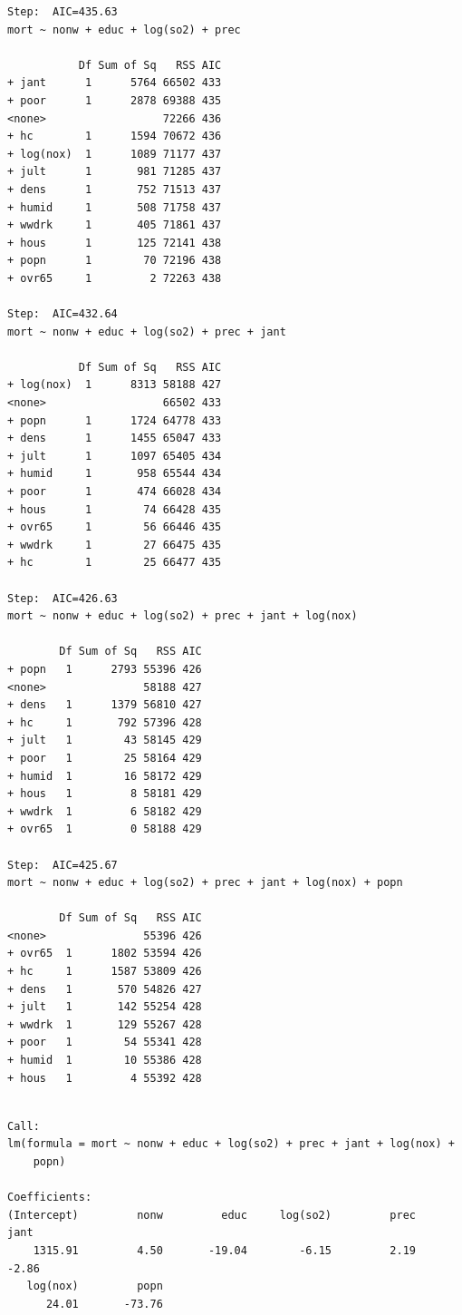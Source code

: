 \documentclass[
]{book}
\begin{document}
\begin{verbatim}
Step:  AIC=435.63
mort ~ nonw + educ + log(so2) + prec

           Df Sum of Sq   RSS AIC
+ jant      1      5764 66502 433
+ poor      1      2878 69388 435
<none>                  72266 436
+ hc        1      1594 70672 436
+ log(nox)  1      1089 71177 437
+ jult      1       981 71285 437
+ dens      1       752 71513 437
+ humid     1       508 71758 437
+ wwdrk     1       405 71861 437
+ hous      1       125 72141 438
+ popn      1        70 72196 438
+ ovr65     1         2 72263 438

Step:  AIC=432.64
mort ~ nonw + educ + log(so2) + prec + jant

           Df Sum of Sq   RSS AIC
+ log(nox)  1      8313 58188 427
<none>                  66502 433
+ popn      1      1724 64778 433
+ dens      1      1455 65047 433
+ jult      1      1097 65405 434
+ humid     1       958 65544 434
+ poor      1       474 66028 434
+ hous      1        74 66428 435
+ ovr65     1        56 66446 435
+ wwdrk     1        27 66475 435
+ hc        1        25 66477 435

Step:  AIC=426.63
mort ~ nonw + educ + log(so2) + prec + jant + log(nox)

        Df Sum of Sq   RSS AIC
+ popn   1      2793 55396 426
<none>               58188 427
+ dens   1      1379 56810 427
+ hc     1       792 57396 428
+ jult   1        43 58145 429
+ poor   1        25 58164 429
+ humid  1        16 58172 429
+ hous   1         8 58181 429
+ wwdrk  1         6 58182 429
+ ovr65  1         0 58188 429

Step:  AIC=425.67
mort ~ nonw + educ + log(so2) + prec + jant + log(nox) + popn

        Df Sum of Sq   RSS AIC
<none>               55396 426
+ ovr65  1      1802 53594 426
+ hc     1      1587 53809 426
+ dens   1       570 54826 427
+ jult   1       142 55254 428
+ wwdrk  1       129 55267 428
+ poor   1        54 55341 428
+ humid  1        10 55386 428
+ hous   1         4 55392 428
\end{verbatim}

\begin{verbatim}

Call:
lm(formula = mort ~ nonw + educ + log(so2) + prec + jant + log(nox) + 
    popn)

Coefficients:
(Intercept)         nonw         educ     log(so2)         prec         jant  
    1315.91         4.50       -19.04        -6.15         2.19        -2.86  
   log(nox)         popn  
      24.01       -73.76  
\end{verbatim}
\end{document}
